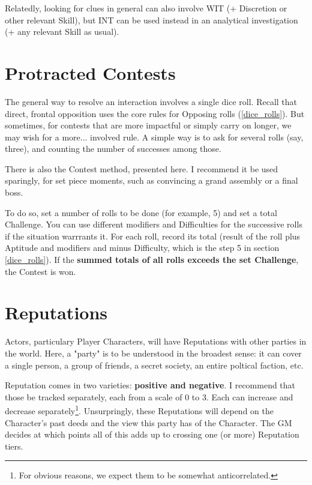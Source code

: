 Relatedly, looking for clues in general can also involve WIT (+ Discretion or other relevant Skill), but INT can be used instead in an analytical investigation (+ any relevant Skill as usual).


\section{Protracted Contests}
\label{protracted}

The general way to resolve an interaction involves a single dice roll. Recall that direct, frontal opposition uses the core rules for Opposing rolls (\ref{dice_rolls}). But sometimes, for contests that are more impactful or simply carry on longer, we may wish for a more... involved rule. A simple way is to ask for several rolls (say, three), and counting the number of successes among those.

There is also the Contest method, presented here. I recommend it be used sparingly, for set piece moments, such as convincing a grand assembly or a final boss. 

To do so, set a number of rolls to be done (for example, 5) and set a total Challenge. You can use different modifiers and Difficulties for the successive rolls if the situation warrrants it. For each roll, record its total (result of the roll plus Aptitude and modifiers and minus Difficulty, which is the step 5 in section \ref{dice_rolls}). If the \textbf{summed totals of all rolls exceeds the set Challenge}, the Contest is won.


\section{Reputations}

\label{reputations}

Actors, particulary Player Characters, will have Reputations with other parties in the world. Here, a "party" is to be understood in the broadest sense: it can cover a single person, a group of friends, a secret society, an entire poltical faction, etc.

Reputation comes in two varieties: \textbf{positive and negative}. I recommend that those be tracked separately, each from a scale of 0 to 3. Each can increase and decrease separately\footnote{For obvious reasons, we expect them to be somewhat anticorrelated.}. Unsurpringly, these Reputations will depend on the Character's past deeds and the view this party has of the Character. The GM decides at which points all of this adds up to crossing one (or more) Reputation tiers.

